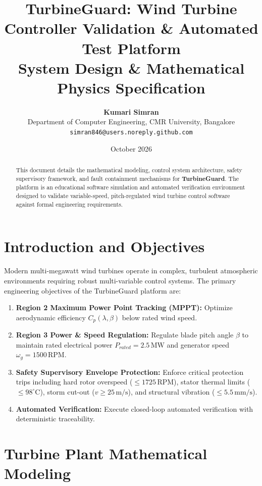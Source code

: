 \documentclass[11pt,a4paper]{article}
\title{\textbf{TurbineGuard: Wind Turbine Controller Validation \& Automated Test Platform}\\
\large System Design \& Mathematical Physics Specification}
\author{\textbf{Kumari Simran}\\
Department of Computer Engineering, CMR University, Bangalore\\
\texttt{simran846@users.noreply.github.com}}
\date{October 2026}
\begin{document}
\maketitle

\begin{abstract}
This document details the mathematical modeling, control system architecture, safety supervisory framework, and fault containment mechanisms for \textbf{TurbineGuard}. The platform is an educational software simulation and automated verification environment designed to validate variable-speed, pitch-regulated wind turbine control software against formal engineering requirements.
\end{abstract}

\section{Introduction and Objectives}
Modern multi-megawatt wind turbines operate in complex, turbulent atmospheric environments requiring robust multi-variable control systems. The primary engineering objectives of the TurbineGuard platform are:
\begin{enumerate}
    \item \textbf{Region 2 Maximum Power Point Tracking (MPPT):} Optimize aerodynamic efficiency $C_p(\lambda, \beta)$ below rated wind speed.
    \item \textbf{Region 3 Power \& Speed Regulation:} Regulate blade pitch angle $\beta$ to maintain rated electrical power $P_{rated} = 2.5\,\text{MW}$ and generator speed $\omega_g = 1500\,\text{RPM}$.
    \item \textbf{Safety Supervisory Envelope Protection:} Enforce critical protection trips including hard rotor overspeed ($\le 1725\,\text{RPM}$), stator thermal limits ($\le 98^\circ\text{C}$), storm cut-out ($v \ge 25\,\text{m/s}$), and structural vibration ($\le 5.5\,\text{mm/s}$).
    \item \textbf{Automated Verification:} Execute closed-loop automated verification with deterministic traceability.
\end{enumerate}

\section{Turbine Plant Mathematical Modeling}
\end{document}
